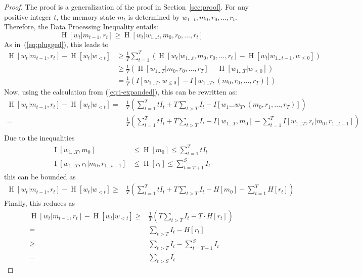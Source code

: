 \documentclass[11pt,letterpaper]{article}
\begin{document}
\begin{proof}
The proof is a generalization of the proof in Section~\ref{sec:proof}.
	For any positive integer $t$, the memory state $m_t$ is determined by $w_{1\dots t}, m_0, r_0, \dots, r_t$.
	Therefore, the Data Processing Inequality entails:
	\begin{equation}
		\operatorname{H}[w_t|m_{t-1}, r_t] \geq \operatorname{H}[w_t|w_{1\dots t}, m_0, r_0, \dots, r_t]
	\end{equation}
	As in~(\ref{eq:plugged}), this leads to
\begin{align}
\operatorname{H}[w_t | m_{t-1}, r_t] - \operatorname{H}[w_t | w_{<t}]& \geq \frac{1}{T} \sum_{t=1}^T ( \operatorname{H}[w_t|w_{1\dots t}, m_0, r_0, \dots, r_t] - \operatorname{H}[w_t | w_{1\dots t-1}, w_{\leq 0}]  )    \\
& \geq \frac{1}{T} \left(\operatorname{H}[w_{1\dots T} | m_0, r_0, \dots, r_T] - \operatorname{H}[w_{1\dots T} | w_{\leq 0}]\right)  \\
	& = \frac{1}{T} \left(I[w_{1\dots T}, w_{\leq 0}] - I[w_{1\dots T}, (m_0, r_0, \dots, r_T)]\right) 
\end{align}
	Now, using the calculation from (\ref{eq:i-expanded}), this can be rewritten as:
	\begin{align*}
\operatorname{H}[w_t | m_{t-1}, r_t] - \operatorname{H}[w_t | w_{<t}]= & \frac{1}{T}\left(\sum_{t=1}^T t I_t + T \sum_{t>T} I_t - I[w_1\dots w_T, (m_0, r_1, ..., r_T)]\right) \\
		= & \frac{1}{T}\left(\sum_{t=1}^T t I_t + T \sum_{t>T} I_t - I[w_{1\dots T}, m_0] - \sum_{t=1}^T I[w_{1\dots T}, r_t|m_0, r_{1\dots t-1}]\right) \\
	\end{align*}
	Due to the inequalities
	\begin{align}
	    \operatorname{I}[w_{1\dots T}, m_0] &\leq \operatorname{H}[m_0] \leq \sum_{t=1}^T t I_t\\
	    \operatorname{I}[w_{1\dots T}, r_t|m_0, r_{1\dots t-1}] &\leq \operatorname{H}[r_t] \leq \sum_{t=T+1}^S I_t
	\end{align}
	this can be bounded as
	\begin{align}
\operatorname{H}[w_t | m_{t-1}, r_t] - \operatorname{H}[w_t | w_{<t}]		\geq & \frac{1}{T}\left(\sum_{t=1}^T t I_t  + T \sum_{t>T} I_t-H[m_0] - \sum_{t=1}^T H[r_t]\right)
	\end{align}
	Finally, this reduces as
	\begin{align}
	\operatorname{H}[w_t | m_{t-1}, r_t] - \operatorname{H}[w_t | w_{<t}]		\geq &  \frac{1}{T}(T \sum_{t>T} I_t - T\cdot H[r_t]) \\
	= & \sum_{t>T} I_t- H[r_t]  \\
		\geq & \sum_{t>T} I_t - \sum_{t=T+1}^S I_t \\
		= &  \sum_{t>S} I_t
\end{align}

\end{proof}
\end{document}
